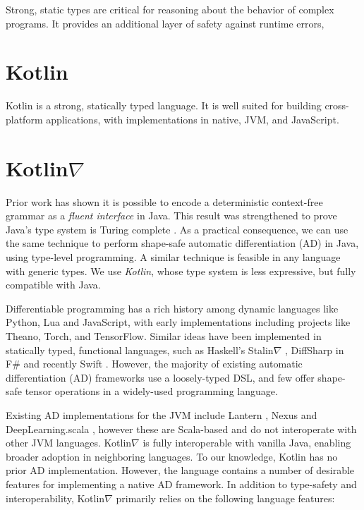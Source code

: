 \documentclass[12pt,initial,twoside,maitrise]{dms}
\numberwithin{equation}{section}
\numberwithin{table}{chapter}
\numberwithin{figure}{chapter}
\begin{document}
Strong, static types are critical for reasoning about the behavior of complex programs. It provides an additional layer of safety against runtime errors,

\section{Kotlin}

Kotlin is a strong, statically typed language. It is well suited for building cross-platform applications, with implementations in native, JVM, and JavaScript.

\section{Kotlin$\nabla$}

Prior work has shown it is possible to encode a deterministic context-free grammar as a \textit{fluent interface} \cite{gil2016formal} in Java. This result was strengthened to prove Java's type system is Turing complete \cite{Grigore:2017:JGT:3009837.3009871}. As a practical consequence, we can use the same technique to perform shape-safe automatic differentiation (AD) in Java, using type-level programming. A similar technique is feasible in any language with generic types. We use \textit{Kotlin}, whose type system is less expressive, but fully compatible with Java.

Differentiable programming has a rich history among dynamic languages like Python, Lua and JavaScript, with early implementations including projects like Theano, Torch, and TensorFlow. Similar ideas have been implemented in statically typed, functional languages, such as Haskell's Stalin$\nabla$ \cite{pearlmutter2008using}, DiffSharp in F\# \cite{baydin-diffsharp} and recently Swift \cite{swift}. However, the majority of existing automatic differentiation (AD) frameworks use a loosely-typed DSL, and few offer shape-safe tensor operations in a widely-used programming language.

Existing AD implementations for the JVM include Lantern \cite{DBLP:journals-corr-abs-1803-10228}, Nexus \cite{chen2017typesafe} and DeepLearning.scala \cite{dl4s}, however these are Scala-based and do not interoperate with other JVM languages. Kotlin$\nabla$ is fully interoperable with vanilla Java, enabling broader adoption in neighboring languages. To our knowledge, Kotlin has no prior AD implementation. However, the language contains a number of desirable features for implementing a native AD framework. In addition to type-safety and interoperability, Kotlin$\nabla$ primarily relies on the following language features:
\end{document}
